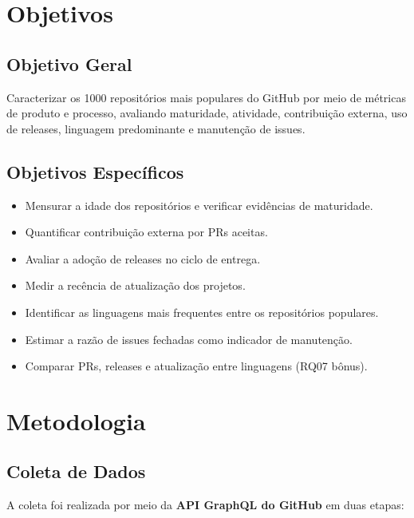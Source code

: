 \documentclass[10pt,a4paper,twocolumn]{article}
\begin{document}
\section{Objetivos}

\subsection{Objetivo Geral}

Caracterizar os 1000 repositórios mais populares do GitHub por meio de
métricas de produto e processo, avaliando maturidade, atividade, contribuição
externa, uso de releases, linguagem predominante e manutenção de issues.

\subsection{Objetivos Específicos}

\begin{itemize}
  \item Mensurar a idade dos repositórios e verificar evidências de maturidade.
  \item Quantificar contribuição externa por PRs aceitas.
  \item Avaliar a adoção de releases no ciclo de entrega.
  \item Medir a recência de atualização dos projetos.
  \item Identificar as linguagens mais frequentes entre os repositórios populares.
  \item Estimar a razão de issues fechadas como indicador de manutenção.
  \item Comparar PRs, releases e atualização entre linguagens (RQ07 bônus).
\end{itemize}

\section{Metodologia}

\subsection{Coleta de Dados}

A coleta foi realizada por meio da \textbf{API GraphQL do GitHub} em duas etapas:
\end{document}
